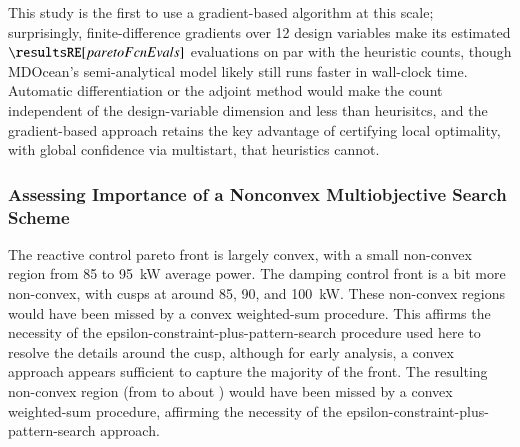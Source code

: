     This study is the first to use a gradient-based algorithm at this scale; surprisingly, finite-difference gradients over 12 design variables make its estimated $\resultsRE[paretoFcnEvals]$ evaluations on par with the heuristic counts, though MDOcean's semi-analytical model likely still runs faster in wall-clock time.
    Automatic differentiation or the adjoint method would make the count independent of the design-variable dimension and less than heurisitcs, and the gradient-based approach retains the key advantage of certifying local optimality, with global confidence via multistart, that heuristics cannot.
\fi


\subsubsection{Assessing Importance of a Nonconvex Multiobjective Search Scheme}
The reactive control pareto front is largely convex, with a small non-convex region from 85 to 95~kW average power.
The damping control front is a bit more non-convex, with cusps at around 85, 90, and 100~kW.
\ifdefined\DISSERTATION
    These non-convex regions would have been missed by a convex weighted-sum procedure.
    This affirms the necessity of the epsilon-constraint-plus-pattern-search procedure used here to resolve the details around the cusp,
    although for early analysis, a convex approach appears sufficient to capture the majority of the front.
\else
    The resulting non-convex region (from \resultsRE[powerAvgAtMinCapex] to about \resultsRE[powerWhereNonconvexEnds]) would have been missed by a convex weighted-sum procedure,
    affirming the necessity of the epsilon-constraint-plus-pattern-search approach.
\fi

\ifdefined\DISSERTATION

